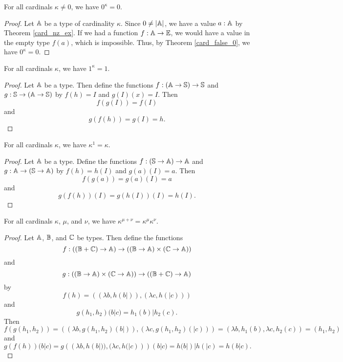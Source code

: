 \documentclass[../../math.tex]{subfiles}
\begin{document}
\begin{theorem}
    For all cardinals $\kappa \neq 0$, we have $0 ^ \kappa = 0$.
\end{theorem}
\begin{proof}
    Let $\mathbb{A}$ be a type of cardinality $\kappa$.  Since $0 \neq |\mathbb{A}|$, we have a
    value $a : \mathbb{A}$ by Theorem \ref{card_nz_ex}.  If we had a function $f : \mathbb{A}
    \to \mathbb{E}$, we would have a value in the empty type $f(a)$, which is
    impossible.  Thus, by Theorem \ref{card_false_0}, we have $0^\kappa = 0$.
\end{proof}

\begin{theorem}
    For all cardinals $\kappa$, we have $1^\kappa = 1$.
\end{theorem}
\begin{proof}
    Let $\mathbb{A}$ be a type.  Then define the functions $f : (\mathbb{A} \to \mathbb{S}) \to \mathbb{S}$ and
    $g : \mathbb{S} \to (\mathbb{A} \to \mathbb{S})$ by $f(h) = I$ and $g(I)(x) = I$.  Then
    \[
        f(g(I)) = f(I)
    \]
    and
    \[
        g(f(h)) = g(I) = h.
    \]
\end{proof}

\begin{theorem}
    For all cardinals $\kappa$, we have $\kappa ^ 1 = \kappa$.
\end{theorem}
\begin{proof}
    Let $\mathbb{A}$ be a type.  Define the functions $f : (\mathbb{S} \to \mathbb{A}) \to \mathbb{A}$ and $g :
    \mathbb{A} \to (\mathbb{S} \to \mathbb{A})$ by $f(h) = h(I)$ and $g(a)(I) = a$.  Then
    \[
        f(g(a)) = g(a)(I) = a
    \]
    and
    \[
        g(f(h))(I) = g(h(I))(I) = h(I).
    \]
\end{proof}

\begin{theorem}
    For all cardinals $\kappa$, $\mu$, and $\nu$, we have $\kappa ^ {\mu + \nu}
    = \kappa ^ \mu \kappa ^ \nu$.
\end{theorem}
\begin{proof}
    Let $\mathbb{A}$, $\mathbb{B}$, and $\mathbb{C}$ be types.  Then define the functions
    \[
        f : ((\mathbb{B} + \mathbb{C}) \to \mathbb{A}) \to ((\mathbb{B} \to \mathbb{A}) \times (\mathbb{C} \to \mathbb{A}))
    \]
    and
    \[
        g : ((\mathbb{B} \to \mathbb{A}) \times (\mathbb{C} \to \mathbb{A})) \to ((\mathbb{B} + \mathbb{C}) \to \mathbb{A})
    \]
    by
    \[
        f(h) = ((\lambda b, h(b|)), (\lambda c, h(|c)))
    \]
    and
    \[
        g(h_1, h_2)(b|c) = h_1(b)|h_2(c).
    \]
    Then
    \[
        f(g(h_1, h_2))
        = ((\lambda b, g(h_1, h_2)(b|)), (\lambda c, g(h_1, h_2)(|c)))
        = (\lambda b, h_1(b), \lambda c, h_2(c))
        = (h_1, h_2)
    \]
    and
    \[
        g(f(h))(b|c)
        = g((\lambda b, h(b|)), (\lambda c, h(|c)))(b|c)
        = h(b|)|h(|c)
        = h(b|c).
    \]
\end{proof}
\end{document}
